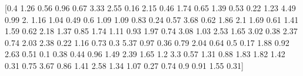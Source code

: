 \documentclass[preview]{standalone}
\begin{document}
\begin{center}
[0.4  1.26 0.56 0.96 0.67 3.33 2.55 0.16 2.15 0.46 1.74 0.65 1.39 0.53
 0.22 1.23 4.49 0.99 2.   1.16 1.04 0.49 0.6  1.09 1.09 0.83 0.24 0.57
 3.68 0.62 1.86 2.1  1.69 0.61 1.41 1.59 0.62 2.18 1.37 0.85 1.74 1.11
 0.93 1.97 0.74 3.08 1.03 2.53 1.65 3.02 0.38 2.37 0.74 2.03 2.38 0.22
 1.16 0.73 0.3  5.37 0.97 0.36 0.79 2.04 0.64 0.5  0.17 1.88 0.92 2.63
 0.51 0.1  0.38 0.44 0.96 1.49 2.39 1.65 1.2  3.3  0.57 1.31 0.88 1.83
 1.82 1.42 0.31 0.75 3.67 0.86 1.41 2.58 1.34 1.07 0.27 0.74 0.9  0.91
 1.55 0.31]
\end{center}
\end{document}
